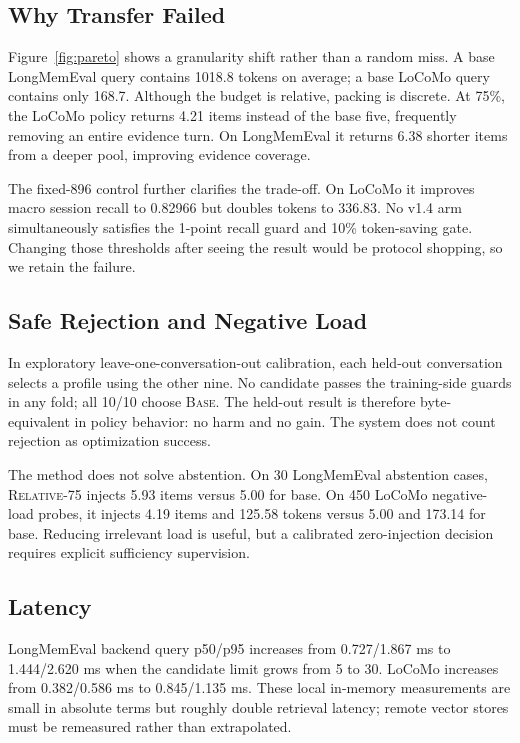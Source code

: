 \documentclass[10pt]{article}
\newcommand{\base}{\textsc{Base}\xspace}
\newcommand{\rel}{\textsc{Relative-75}\xspace}
\begin{document}
\subsection{Why Transfer Failed}

Figure~\ref{fig:pareto} shows a granularity shift rather than a random miss. A
base LongMemEval query contains 1018.8 tokens on average; a base LoCoMo query
contains only 168.7. Although the budget is relative, packing is discrete. At
75\%, the LoCoMo policy returns 4.21 items instead of the base five, frequently
removing an entire evidence turn. On LongMemEval it returns 6.38 shorter items
from a deeper pool, improving evidence coverage.

The fixed-896 control further clarifies the trade-off. On LoCoMo it improves
macro session recall to 0.82966 but doubles tokens to 336.83. No v1.4 arm
simultaneously satisfies the 1-point recall guard and 10\% token-saving gate.
Changing those thresholds after seeing the result would be protocol shopping,
so we retain the failure.

\subsection{Safe Rejection and Negative Load}

In exploratory leave-one-conversation-out calibration, each held-out
conversation selects a profile using the other nine. No candidate passes the
training-side guards in any fold; all 10/10 choose \base. The held-out result is
therefore byte-equivalent in policy behavior: no harm and no gain. The system
does not count rejection as optimization success.

The method does not solve abstention. On 30 LongMemEval abstention cases,
\rel{} injects 5.93 items versus 5.00 for base. On 450 LoCoMo negative-load
probes, it injects 4.19 items and 125.58 tokens versus 5.00 and 173.14 for base.
Reducing irrelevant load is useful, but a calibrated zero-injection decision
requires explicit sufficiency supervision.

\subsection{Latency}

LongMemEval backend query p50/p95 increases from 0.727/1.867 ms to
1.444/2.620 ms when the candidate limit grows from 5 to 30. LoCoMo increases
from 0.382/0.586 ms to 0.845/1.135 ms. These local in-memory measurements are
small in absolute terms but roughly double retrieval latency; remote vector
stores must be remeasured rather than extrapolated.
\end{document}
